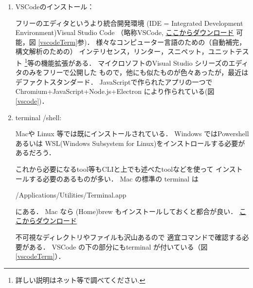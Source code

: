 \begin{Q}
\begin{enumerate}
   \item
      VSCodeのインストール：
       
                   フリーのエディタというより統合開発環境
            (IDE = Integrated Development Environment)Visual Studio Code
            （略称VSCode, \href{https://code.visualstudio.com}{ここからダウンロード}
            可能，図 \ref{vscodeTerm}参)．
            様々なコンピューター言語のための（自動補完，構文解析のための）
            インテリセンス，リンター，スニペット，ユニットテスト
            \footnote{詳しい説明はネット等で調べてください.}等の機能拡張がある．
            マイクロソフトのVisual Studio  シリーズのエディタのみをフリーで公開した
            もので，他にも似たものが色々あったが，最近はデファクトスタンダード．
            JavaScriptで作られたアプリの一つで
            Chromium+JavaScript+Node.js+Electron 
            により作られている(図 \ref{vscode})．
        
   \item
         terminal /shell:
       
       Macや Linux 等では既にインストールされている．
       Windows ではPowershell あるいは
       WSL(Windows Subsystem for Linux)をインストロールする必要があるだろう．
       
      これから必要になるtool等もCLIと上でも述べたtoolなどを使って
       インストールする必要のあるものが多い．
       Mac の標準の terminal は
      
       /Applications/Utilities/Terminal.app
   
       \noindent
       にある．
      Mac なら (Home)brew もインストールしておくと都合が良い．
      \href{https://brew.sh/ja/}{ここからダウンロード}
       
       不可視なディレクトリやファイルも沢山あるので
       適宜コマンドで確認する必要がある．
      VSCode の下の部分にもterminal が付いている（図 \ref{vscodeTerm}）．

%      
%         
%         
%         
%         
%         
         

\end{enumerate}
\end{Q}
